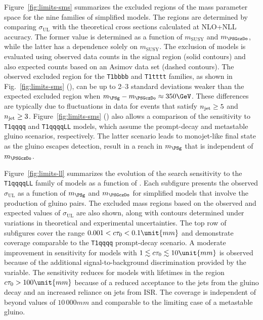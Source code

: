 Figure~\ref{fig:limits-sms} summarizes the excluded regions of the
mass parameter space for the nine families of simplified models. The
regions are determined by comparing $\sigma_\text{UL}$
with the theoretical cross sections calculated at NLO+NLL accuracy. 
The former value is determined as a function of $m_{\text{SUSY}}$ and
$m_{\PSGczDo}$, while the latter has a dependence solely on
$m_{\text{SUSY}}$. The exclusion of models is evaluated using observed
data counts in the signal region (solid contours) and also expected
counts based on an Asimov data set (dashed contours). 
%
The observed excluded region for the \texttt{T1bbbb} and
\texttt{T1tttt} families, as shown in Fig.~\ref{fig:limits-sms}
(\cmsRight), can be up to 2--3 standard deviations weaker than the
expected excluded region when $m_{\PSg} - m_{\PSGczDo} \approx
350\GeV$. These differences are typically due to fluctuations in data
for events that satisfy $\njet \geq 5$ and $\njet \geq
3$. Figure~\ref{fig:limits-sms} (\cmsRight) also allows a comparison
of the sensitivity to \texttt{T1qqqq} and \texttt{T1qqqqLL} models,
which assume the prompt-decay and metastable gluino scenarios,
respectively. The latter scenario leads to monojet-like final state as
the gluino escapes detection, result in a reach in $m_\PSg$ that is
independent of $m_{\PSGczDo}$.

Figure~\ref{fig:limits-ll} summarizes the evolution of the search
sensitivity to the \texttt{T1qqqqLL} family of models as a function of
\ctau. Each subfigure presents the observed $\sigma_\text{UL}$ as a
function of $m_{\PSg}$ and $m_{\PSGczDo}$ for simplified models that
involve the production of gluino pairs. The excluded mass regions
based on the observed and expected values of $\sigma_\text{UL}$ are
also shown, along with contours determined under variations in
theoretical and experimental uncertainties. The top row of subfigures
cover the range $0.001 < \ctau < 0.1\unit{mm}$ and demonstrate
coverage comparable to the \texttt{T1qqqq} prompt-decay scenario. A
moderate improvement in sensitivity for models with $1 \lesssim \ctau
\lesssim 10\unit{mm}$ is observed because of the additional
signal-to-background discrimination provided by the \nb variable. The
sensitivity reduces for models with lifetimes in the region $\ctau >
100\unit{mm}$ because of a reduced acceptance to the jets from the
gluino decay and an increased reliance on jets from ISR. The coverage
is independent of \ctau beyond values of $10\,000\unit{mm}$ and
comparable to the limiting case of a metastable gluino. 

